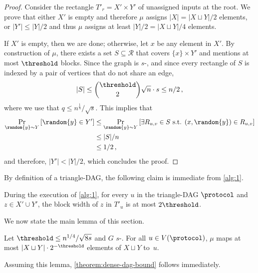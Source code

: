 {}{
\begin{proof}
Consider the rectangle $T'_r = X'\times Y'$ of unassigned inputs at the root. 
We prove that either $X'$ is empty and therefore $\mu$ assigns $\lvert X\rvert = \lvert X\sqcup Y\rvert /2$ elements, or $\lvert Y' \rvert \le \lvert Y\rvert/2$ and thus $\mu$ assigns at least $\lvert Y\rvert/2 = \lvert X\sqcup Y\rvert /4$ elements.

If $X'$ is empty, then we are done; otherwise, let $x$ be any element in $X'$. By construction of $\mu$,  there exists a set $S\subseteq \mathcal{R}$ that covers $\{x\}\times Y'$ and mentions at most $\threshold$ blocks. Since the graph is $s$-\ndense, and since every rectangle of $S$ is indexed by a pair of vertices that do not share an edge, 
\begin{equation}
\lvert S\rvert \leq 
\binom{\threshold}{2} 
\sqrt{n}
\cdot
s \leq 
n/2 \,,
\end{equation}
where we use that $q \leq n^{\frac{1}{4}}/\sqrt{s}$.
This implies that
\begin{align*}
    \Pr_{\random{y}\sim Y}\left[\random{y}\in Y'\right] 
    &\leq \Pr_{\random{y}\sim Y}\left[\exists R_{u,v}\in S\text{ s.t. } (x,\random{y})\in R_{u,v}\right]\\
    &\leq \lvert S\rvert /n \\
    &\leq 1/2\,,
\end{align*}
and therefore, $\lvert Y'\rvert  < \lvert Y\rvert /2$, which concludes the proof.
\end{proof}
}

By definition of a triangle-DAG, the following claim is immediate from  \autoref{alg:1}. 
\begin{claim}
    During the execution of \autoref{alg:1}, for every $u$ in the triangle-DAG $\protocol$ and $z\in X'\cup Y'$, the block width of $z$ in $T'_u$ is at most $2\threshold$.
\end{claim}

We now state the main lemma of this section.
\begin{lemma}
    \label{lemma:few x are assigned per node}
    Let $\threshold\leq n^{1/4}/\sqrt{8s}$ and $G$ $s$-\ndense. For all $u\in V(\protocol)$, $\mu$ maps at most $\lvert X \sqcup Y\rvert \cdot 2^{-\threshold}$ elements of $X\sqcup Y$ to~$u$. 
\end{lemma}

Assuming this lemma, \autoref{theorem:dense-dag-bound} follows immediately.

